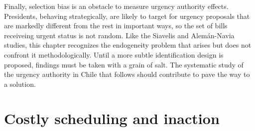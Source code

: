 \documentclass[letter,12pt]{article}
\begin{document}
Finally, selection bias is an obstacle to measure urgency authority effects. Presidents, behaving strategically, are likely to target for urgency proposals that are markedly different from the rest in important ways, so the set of bills receiveing urgent status is not random. Like the Siavelis and Alem\'an-Navia studies, this chapter recognizes the endogeneity problem that arises but does not confront it methodologically. Until a more subtle identification design is proposed, findings must be taken with a grain of salt. The systematic study of the urgency authority in Chile that follows should contribute to pave the way to a solution. 




\section{Costly scheduling and inaction}
\end{document}
